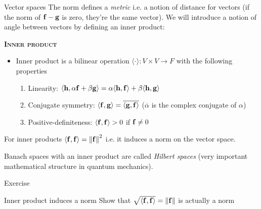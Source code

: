 
\begin{frame}{Vector spaces}
	The norm defines a \emph{metric} i.e. a notion of distance for vectors (if the norm of $ \mathbf{f} - \mathbf{g} $ is zero, they're the same vector). We will introduce a notion of angle between vectors by defining an \alert{inner product}:
	
	\textbf{\textsc{Inner product}}
	\begin{itemize}
		\item Inner product is a bilinear operation $ \langle \cdot \rangle : V \times V \to F $ with the following properties
		\begin{enumerate}
			\item Linearity: $ \langle \mathbf{h}, \alpha \mathbf{f} + \beta \mathbf{g} \rangle = \alpha \langle \mathbf{h}, \mathbf{f} \rangle + \beta \langle \mathbf{h}, \mathbf{g} \rangle $
			\item Conjugate symmetry: $ \langle \mathbf{f}, \mathbf{g} \rangle = \overline{\langle \mathbf{g}, \mathbf{f} \rangle} $ ($ \overline{\alpha} $ is the complex conjugate of $ \alpha $)
			\item Positive-definiteness: $ \langle \mathbf{f}, \mathbf{f} \rangle > 0 $ if $ \mathbf{f} \neq 0 $
		\end{enumerate}
	\end{itemize}
For inner products $ \langle \mathbf{f}, \mathbf{f} \rangle = \left\lVert\mathbf{f}\right\rVert^2 $ i.e. it induces a norm on the vector space.

{\color{olive} Banach spaces with an inner product are called \emph{Hilbert spaces} (very important mathematical structure in quantum mechanics).}
\end{frame}


\begin{frame}{Exercise \theexercise}
\centering
	\begin{block}{Inner product induces a norm}
		Show that $ \sqrt{\langle \mathbf{f}, \mathbf{f} \rangle} = \left\lVert\mathbf{f}\right\rVert $ is actually a norm
	\end{block}	
\end{frame}

